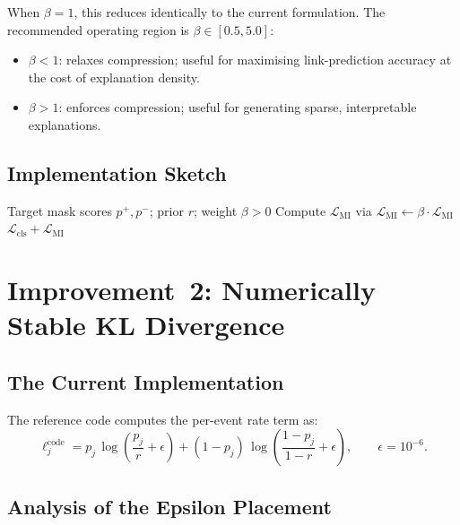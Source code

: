 \documentclass[11pt,a4paper]{article}
\newcommand{\loss}{\mathcal{L}}
\begin{document}
When $\beta = 1$, this reduces identically to the current formulation.
The recommended operating region is $\beta \in [0.5, 5.0]$:
\begin{itemize}[leftmargin=*,itemsep=1pt]
  \item $\beta < 1$: relaxes compression; useful for maximising
        link-prediction accuracy at the cost of explanation density.
  \item $\beta > 1$: enforces compression; useful for generating
        sparse, interpretable explanations.
\end{itemize}

\subsection{Implementation Sketch}

\begin{algorithm}[H]
\caption{Forward pass with explicit $\beta$}
\label{alg:beta}
\begin{algorithmic}[1]
\REQUIRE Target mask scores $p^+, p^-$; prior $r$; weight $\beta > 0$
\STATE Compute $\loss_{\text{MI}}$ via 
\STATE $\loss_{\text{MI}} \leftarrow \beta \cdot \loss_{\text{MI}}$
\RETURN $\loss_{\text{cls}} + \loss_{\text{MI}}$
\end{algorithmic}
\end{algorithm}

\section{Improvement~2: Numerically Stable KL Divergence}
\label{sec:kl_stability}

\subsection{The Current Implementation}

The reference code computes the per-event rate term as:
\begin{equation}
\label{eq:kl_code}
\ell_j^{\text{code}}
  = p_j \,\log\!\left(\frac{p_j}{r} + \epsilon\right)
  + (1 - p_j)\,\log\!\left(\frac{1 - p_j}{1 - r} + \epsilon\right),
  \qquad \epsilon = 10^{-6}.
\end{equation}

\subsection{Analysis of the Epsilon Placement}
\end{document}
